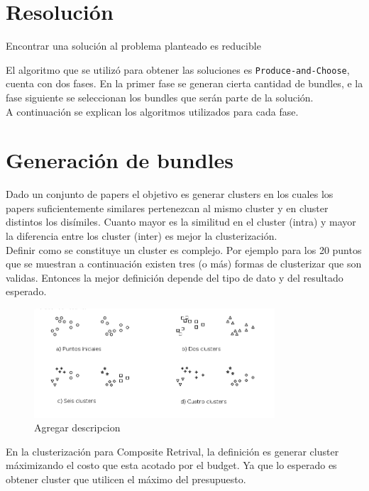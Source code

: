 \section{Resolución}
Encontrar una solución al problema planteado es reducible 

El algoritmo que se utilizó para obtener las soluciones es \texttt{Produce-and-Choose}, cuenta con 
dos fases. En la primer fase se generan cierta cantidad de bundles, e la fase siguiente se seleccionan los bundles que serán parte de la solución.\\
A continuación se explican los algoritmos utilizados para cada fase.
\section{Generación de bundles}
Dado un conjunto de papers el objetivo es generar clusters en los cuales los papers suficientemente similares pertenezcan al mismo cluster y en cluster distintos los disímiles. Cuanto mayor es la similitud en el cluster (intra) y mayor la diferencia entre los cluster (inter) es mejor la clusterización.\\
Definir como se constituye un cluster es complejo. Por ejemplo para los 20 puntos que se muestran a continuación existen tres (o más) formas de clusterizar que son validas. Entonces la mejor definición depende del tipo de dato y del resultado esperado.

\begin{figure}[H]
  \centering
    \includegraphics[width=0.8\textwidth]{img/howToCluster.png}
  \caption{Agregar descripcion}
  \label{res:img-howToCluster}
\end{figure}

En la clusterización para Composite Retrival, la definición es generar cluster máximizando el costo que esta acotado por el budget.
Ya que lo esperado es obtener cluster que utilicen el máximo del presupuesto.\\

